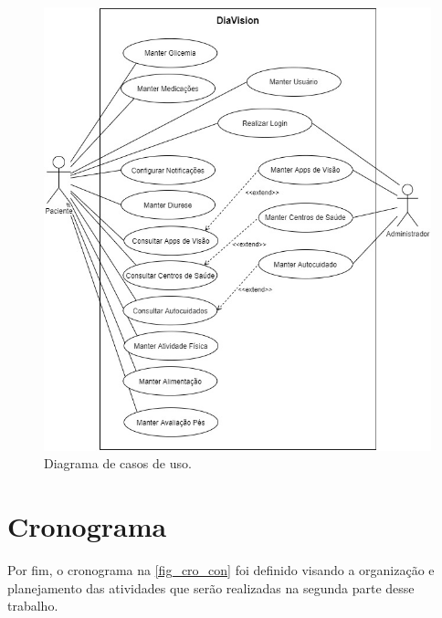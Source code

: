 \begin{figure}[htb]
    \caption{\label{fig_use_cas}Diagrama de casos de uso.}
    \begin{center}
        \includegraphics[scale=0.65]{Imagens/proposta/use_case.jpg}
    \end{center}
\end{figure}

\newpage

\section{Cronograma}

Por fim, o cronograma na \autoref{fig_cro_con} foi definido visando a organização e planejamento das atividades que serão realizadas
na segunda parte desse trabalho.

